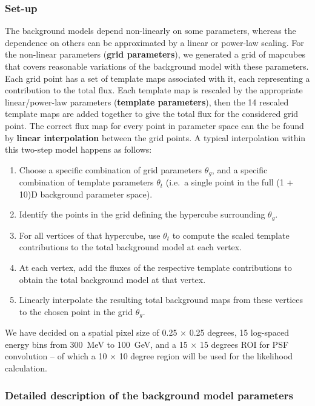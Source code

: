 \documentclass{article}
\begin{document}
\subsubsection{Set-up}
The background models depend non-linearly on some parameters, whereas the dependence on others can be approximated by a linear or power-law scaling. For the non-linear parameters ({\bf grid parameters}), we generated a grid of mapcubes that covers reasonable variations of the background model with these parameters. Each grid point has a set of template maps associated with it, each representing a contribution to the total flux. Each template map is rescaled by the appropriate linear/power-law parameters ({\bf template parameters}), then the 14 rescaled template maps are added together to give the total flux for the considered grid point. The correct flux map for every point in parameter space can the be found by {\bf linear interpolation} between the grid points. A typical interpolation within this two-step model happens as follows:
\begin{enumerate}
\item Choose a specific combination of grid parameters $\theta_g$, and a specific combination of template parameters $\theta_t$ (i.e.\ a single point in the full (1 + 10)D background parameter space).
\item Identify the points in the grid defining the hypercube surrounding $\theta_g$.
\item For all vertices of that hypercube, use $\theta_t$ to compute the scaled template contributions to the total background model at each vertex.
\item At each vertex, add the fluxes of the respective template contributions to obtain the total background model at that vertex.
\item Linearly interpolate the resulting total background maps from these vertices to the chosen point in the grid $\theta_g$.
\end{enumerate}

We have decided on a spatial pixel size of 0.25 $\times$ 0.25 degrees, 15 log-spaced energy bins from 300\ MeV to 100\ GeV, and a 15 $\times$ 15 degrees ROI for PSF convolution -- of which a 10 $\times$ 10 degree region will be used for the likelihood calculation.

\subsubsection{Detailed description of the background model parameters}
\end{document}
